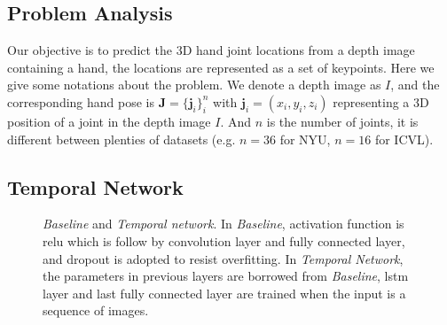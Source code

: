 \documentclass[journal,comsoc]{IEEEtran}
\let\MYoriglatexcaption\caption
\renewcommand{\caption}[2][\relax]{\MYoriglatexcaption[#2]{#2}}
\newcommand{\J}{\textbf{J}}
\begin{document}
\subsection{Problem Analysis}\label{sec:problem analysis}
Our objective is to predict the 3D hand joint locations from a depth image containing a hand,
the locations are represented as a set of keypoints. Here we give some notations about the
problem. We denote a depth image as $I$, and the corresponding hand pose is
$\J=\{\textbf{j}_i\}_i^n$ with $\textbf{j}_i=(x_i,y_i,z_i)$ representing a 3D position of a
joint in the depth image $I$. And $n$ is the number of joints, it is different between plenties
of datasets (e.g. $n=36$ for NYU, $n=16$ for ICVL).


\subsection{Temporal Network}\label{sec:temporal netowork}
\begin{figure}[t]
    \centering
\caption{\emph{Baseline} and \emph{Temporal network}. In \emph{Baseline}, activation
function is relu which is follow by convolution layer and fully connected layer, and dropout is
adopted to resist overfitting. In \emph{Temporal Network}, the parameters in previous layers are
borrowed from \emph{Baseline}, lstm layer and last fully connected layer are trained when
the input is a sequence of images.}
\label{fig:baseline and lstm network}
\end{figure}
\end{document}
